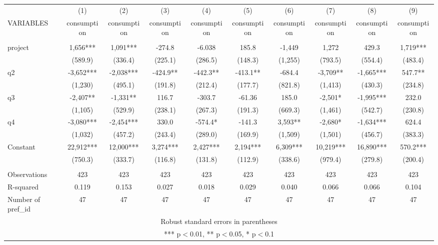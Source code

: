 \documentclass[]{article}
\begin{document}
\small
\begin{tabular}{lccccccccc} \hline
 & (1) & (2) & (3) & (4) & (5) & (6) & (7) & (8) & (9) \\
VARIABLES & consumption & consumption & consumption & consumption & consumption & consumption & consumption & consumption & consumption \\ \hline
 &  &  &  &  &  &  &  &  &  \\
project & 1,656*** & 1,091*** & -274.8 & -6.038 & 185.8 & -1,449 & 1,272 & 429.3 & 1,719*** \\
 & (589.9) & (336.4) & (225.1) & (286.5) & (148.3) & (1,255) & (793.5) & (554.4) & (483.4) \\
q2 & -3,652*** & -2,038*** & -424.9** & -442.3** & -413.1** & -684.4 & -3,709** & -1,665*** & 547.7** \\
 & (1,230) & (495.1) & (191.8) & (212.4) & (177.7) & (821.8) & (1,413) & (430.3) & (234.8) \\
q3 & -2,407** & -1,331** & 116.7 & -303.7 & -61.36 & 185.0 & -2,501* & -1,995*** & 232.0 \\
 & (1,105) & (529.9) & (238.1) & (267.3) & (191.3) & (669.3) & (1,461) & (542.7) & (230.8) \\
q4 & -3,080*** & -2,454*** & 330.0 & -574.4* & -141.3 & 3,593** & -2,680* & -1,634*** & 624.4 \\
 & (1,032) & (457.2) & (243.4) & (289.0) & (169.9) & (1,509) & (1,501) & (456.7) & (383.3) \\
Constant & 22,912*** & 12,000*** & 3,274*** & 2,427*** & 2,194*** & 6,309*** & 10,219*** & 16,890*** & 570.2*** \\
 & (750.3) & (333.7) & (116.8) & (131.8) & (112.9) & (338.6) & (979.4) & (279.8) & (200.4) \\
 &  &  &  &  &  &  &  &  &  \\
Observations & 423 & 423 & 423 & 423 & 423 & 423 & 423 & 423 & 423 \\
R-squared & 0.119 & 0.153 & 0.027 & 0.018 & 0.029 & 0.040 & 0.066 & 0.066 & 0.104 \\
 Number of pref\_id & 47 & 47 & 47 & 47 & 47 & 47 & 47 & 47 & 47 \\ \hline
\multicolumn{10}{c}{ Robust standard errors in parentheses} \\
\multicolumn{10}{c}{ *** p$<$0.01, ** p$<$0.05, * p$<$0.1} \\
\end{tabular}
\end{document}
